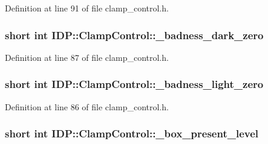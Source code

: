 Definition at line 91 of file clamp\_\-control.h.

\hypertarget{classIDP_1_1ClampControl_aa17b2cb9431db23053f27a0955d26548}{
\subsubsection[{\_\-badness\_\-dark\_\-zero}]{\setlength{\rightskip}{0pt plus 5cm}short int {\bf IDP::ClampControl::\_\-badness\_\-dark\_\-zero}}}
\label{classIDP_1_1ClampControl_aa17b2cb9431db23053f27a0955d26548}


Definition at line 87 of file clamp\_\-control.h.

\hypertarget{classIDP_1_1ClampControl_a1391b175b26be6760be280f8e1b8bd4c}{
\subsubsection[{\_\-badness\_\-light\_\-zero}]{\setlength{\rightskip}{0pt plus 5cm}short int {\bf IDP::ClampControl::\_\-badness\_\-light\_\-zero}}}
\label{classIDP_1_1ClampControl_a1391b175b26be6760be280f8e1b8bd4c}


Definition at line 86 of file clamp\_\-control.h.

\hypertarget{classIDP_1_1ClampControl_a486cebcf52979b03361cce9ecb84f2e3}{
\subsubsection[{\_\-box\_\-present\_\-level}]{\setlength{\rightskip}{0pt plus 5cm}short int {\bf IDP::ClampControl::\_\-box\_\-present\_\-level}}}
\label{classIDP_1_1ClampControl_a486cebcf52979b03361cce9ecb84f2e3}


